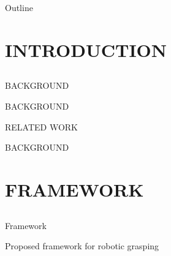 \documentclass[xcolor=table,compress,blue]{beamer}
\begin{document}
\frame{
    \titlepage
    \thispagestyle{empty}
}
\begin{frame}{Outline}
  \tableofcontents
\end{frame}

\section{INTRODUCTION}
\subsection{}
\begin{frame}{BACKGROUND}
	\begin{exampleblock}{BACKGROUND}
		
	\end{exampleblock}
\end{frame}
\begin{frame}{RELATED WORK}
	\begin{exampleblock}{BACKGROUND}
		
	\end{exampleblock}
\end{frame}



 
\section{FRAMEWORK}
\subsection{}
\begin{frame}{Framework}
	\begin{exampleblock}{Proposed framework for robotic grasping}
		
	
	\end{exampleblock}
\end{frame}



\end{document}
